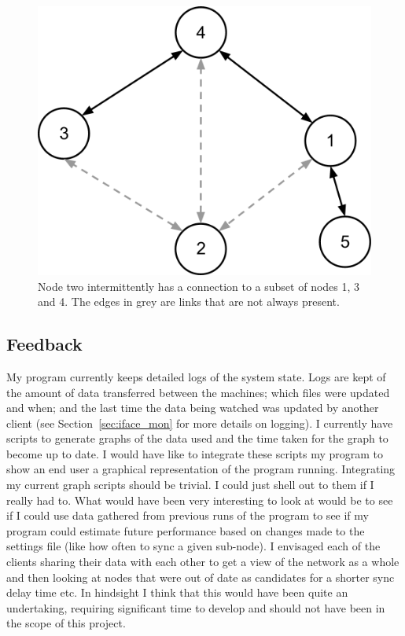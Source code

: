 \documentclass[12pt]{article}
\begin{document}
\begin{figure}[htp]
    \centering
    \includegraphics[scale=0.5]{images/mobile-node.png}
    \caption{Node two intermittently has a connection to a subset
    of nodes 1, 3 and 4. The edges in grey are links that are not
    always present.}
    \label{fig:mobile_node}
\end{figure}

\pagebreak

\subsection{Feedback}
\label{sec:feedback}
My program currently keeps detailed logs of the
system state. Logs are kept of the amount of data
transferred between the machines; which files were updated
and when; and the last time the data being watched was updated
by another client (see Section~\ref{sec:iface_mon} for more details
on logging).
I currently have scripts to generate graphs of the data used
and the time taken for the graph to become up to date.
I would have like to integrate these scripts my program
to show an end user a graphical representation of the
program running. Integrating my current graph scripts
should be trivial. I could just shell out to them if
I really had to. What would have been very interesting
to look at would be to see if I could use data gathered
from previous runs of the program to see if my program
could estimate future performance based on changes
made to the settings file (like how often to sync a
given sub-node). I envisaged each of the clients
sharing their data with each other to get a view
of the network as a whole and then looking at nodes
that were out of date as candidates for a shorter
sync delay time etc. In hindsight I think that this
would have been quite an undertaking, requiring
significant time to develop and should not have
been in the scope of this project.
\end{document}

